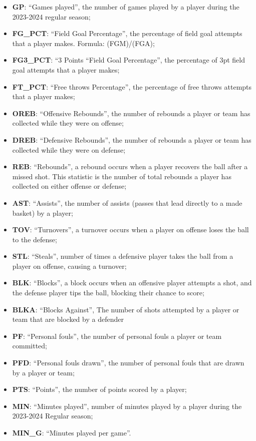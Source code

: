 \documentclass[
]{article}
\providecommand{\tightlist}{%
  \setlength{\itemsep}{0pt}\setlength{\parskip}{0pt}}
\begin{document}
\begin{itemize}
\tightlist
\item
  \textbf{GP}: ``Games played'', the number of games played by a player
  during the 2023-2024 regular season;
\item
  \textbf{FG\_PCT}: ``Field Goal Percentage'', the percentage of field
  goal attempts that a player makes. Formula: (FGM)/(FGA);
\item
  \textbf{FG3\_PCT}: ``3 Points ``Field Goal Percentage'', the
  percentage of 3pt field goal attempts that a player makes;
\item
  \textbf{FT\_PCT}: ``Free throws Percentage'', the percentage of free
  throws attempts that a player makes;
\item
  \textbf{OREB}: ``Offensive Rebounds'', the number of rebounds a player
  or team has collected while they were on offense;
\item
  \textbf{DREB}: ``Defensive Rebounds'', the number of rebounds a player
  or team has collected while they were on defense;
\item
  \textbf{REB}: ``Rebounds'', a rebound occurs when a player recovers
  the ball after a missed shot. This statistic is the number of total
  rebounds a player has collected on either offense or defense;
\item
  \textbf{AST}: ``Assists'', the number of assists (passes that lead
  directly to a made basket) by a player;
\item
  \textbf{TOV}: ``Turnovers'', a turnover occurs when a player on
  offense loses the ball to the defense;
\item
  \textbf{STL}: ``Steals'', number of times a defensive player takes the
  ball from a player on offense, causing a turnover;
\item
  \textbf{BLK}: ``Blocks'', a block occurs when an offensive player
  attempts a shot, and the defense player tips the ball, blocking their
  chance to score;
\item
  \textbf{BLKA}: ``Blocks Against'', The number of shots attempted by a
  player or team that are blocked by a defender
\item
  \textbf{PF}: ``Personal fouls'', the number of personal fouls a player
  or team committed;
\item
  \textbf{PFD}: ``Personal fouls drawn'', the number of personal fouls
  that are drawn by a player or team;
\item
  \textbf{PTS}: ``Points'', the number of points scored by a player;
\item
  \textbf{MIN}: ``Minutes played'', number of minutes played by a player
  during the 2023-2024 Regular season;
\item
  \textbf{MIN\_G}: ``Minutes played per game''.
\end{itemize}
\end{document}
